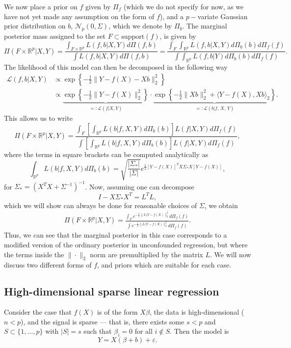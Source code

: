 \documentclass[11pt]{article}
\newcommand{\subparspace}{\vspace{3mm} \\}
\newcommand{\eps}{\varepsilon}
\newcommand{\R}{\mathbb{R}}
\newcommand{\Li}{\mathcal{L}}
\newcommand{\postCov}{\Sigma_*}
\begin{document}
 We now place a prior on $f$ given by $\Pi_f$ (which we do not specify for now, as we have not yet made any assumption on the form of $f$), and a $p-$variate Gaussian prior distribution on $b$, $\mathcal{N}_p(0, \Sigma)$, which we denote by $\Pi_b$. The marginal posterior mass assigned to the set $F \subset \textrm{support}(f)$, is given by
$$
\Pi(F \times \R^p | X, Y) = \frac{\int_{F \times \R^p} L(f, b | X, Y) d\Pi(f, b) }{\int L(f, b | X, Y) d\Pi(f, b)} = \frac{\int_F \int_{\R^p} L(f, b | X, Y) d\Pi_b(b) d\Pi_f(f) }{\int \int_{\R^p} L(f, b | Y) d\Pi_b(b) d\Pi_f(f)}.
$$
 The likelihood of this model can then be decomposed in the following way
\begin{align*}
 \Li (f, b | X, Y) &\propto \exp\left\{-\frac{1}{2}\|Y - f(X) - Xb\|_2^2\right\} \\
	&\propto \underbrace{\exp\left\{-\frac{1}{2}\|Y - f(X) \|_2^2\right\}}_{=: \Li(f | X, Y)}\cdot \underbrace{\exp\left\{-\frac{1}{2}\|Xb\|_2^2 + \langle Y - f(X), Xb\rangle_2 \right\}}_{=: \Li(b | f, \, X, \, Y)}. 
\end{align*}
This allows us to write
$$
\Pi(F \times \R^p | X, Y) =\frac{\int_F \left[\int_{\R^p} L(b|f, X, Y) d\Pi_b(b) \right] L(f| X, Y)d\Pi_f(f) }{\int \left[\int_{\R^p} L(b|f, X, Y) d\Pi_b(b) \right]L(f| X, Y) d\Pi_f(f)},
$$
where the terms in square brackets can be computed analytically as 
$$
\int_{\R^p} L(b|f, X, Y) d\Pi_b(b) = \sqrt{\frac{|\postCov|}{|\Sigma|}} e^{\frac{1}{2}[Y - f(X)]^TX\postCov X[Y - f(X)]},
$$
for $\postCov = (X^TX + \Sigma^{-1})^{-1}$. Now, assuming one can decompose $$I - X\postCov X^T = L^TL,$$ which we will show can always be done for reasonable choices of $\Sigma$, we obtain
\begin{align}
	\Pi(F \times \R^p | X, Y) = \frac{\int_F e^{-\frac{1}{2}\|L(Y - f(X)\|_2^2} d\Pi_{f}(f) }{\int e^{-\frac{1}{2}\|L(Y - f(X)\|_2^2} d\Pi_f(f)}. \label{eq:marginal_posterior_form_general}
\end{align} 
Thus, we can see that the marginal posterior in this case corresponds to a modified version of the ordinary posterior in unconfounded regression, but where the terms inside the $\|\cdot\|_2$ norm are premultiplied by the matrix $L$. We will now discuss two different forms of $f$, and priors which are suitable for each case.
\subsection{High-dimensional sparse linear regression}
Consider the case that $f(X)$ is of the form $X \beta$, the data is high-dimensional ($n < p$), and the signal is sparse --- that is, there exists some $s < p$ and $S \subset \{1, \dots, p\}$ with $|S| = s$ such that $\beta_i = 0$ for all $i \notin S$. Then the model is
\begin{equation}
Y = X (\beta + b) + \eps.	\label{eq:perturbed_lm}
\end{equation}
\end{document}

